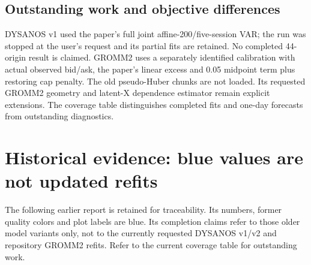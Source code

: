 \documentclass[11pt]{article}
\begin{document}
\endgroup

\subsection{Outstanding work and objective differences}

DYSANOS v1 used the paper's full joint affine-200/five-session VAR; the run was stopped at the user's request and its partial fits are retained. No completed 44-origin result is claimed. GROMM2 uses a separately identified calibration with actual observed bid/ask, the paper's linear excess and 0.05 midpoint term plus restoring cap penalty. The old pseudo-Huber chunks are not loaded. Its requested GROMM2 geometry and latent-X dependence estimator remain explicit extensions. The coverage table distinguishes completed fits and one-day forecasts from outstanding diagnostics.

\clearpage\appendix\section{Historical evidence: blue values are not updated refits}

The following earlier report is retained for traceability. Its numbers, former quality colors and plot labels are blue. Its completion claims refer to those older model variants only, not to the currently requested DYSANOS v1/v2 and repository GROMM2 refits. Refer to the current coverage table for outstanding work.
\begingroup\color{blue}
\end{document}
